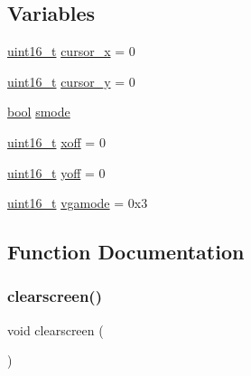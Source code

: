 \subsection*{Variables}
\begin{DoxyCompactItemize}
\item 
\hyperlink{a00134_a273cf69d639a59973b6019625df33e30_a273cf69d639a59973b6019625df33e30}{uint16\+\_\+t} \hyperlink{a00173_ae69604af0f9bd5fca2a016d0aa1ba7e1_ae69604af0f9bd5fca2a016d0aa1ba7e1}{cursor\+\_\+x} = 0
\item 
\hyperlink{a00134_a273cf69d639a59973b6019625df33e30_a273cf69d639a59973b6019625df33e30}{uint16\+\_\+t} \hyperlink{a00173_a0301c5492919c401c2c1ecf52af709b0_a0301c5492919c401c2c1ecf52af709b0}{cursor\+\_\+y} = 0
\item 
\hyperlink{a00134_af6a258d8f3ee5206d682d799316314b1_af6a258d8f3ee5206d682d799316314b1}{bool} \hyperlink{a00173_a22b8d30f7aee33f172c1239aed53e7db_a22b8d30f7aee33f172c1239aed53e7db}{smode}
\item 
\hyperlink{a00134_a273cf69d639a59973b6019625df33e30_a273cf69d639a59973b6019625df33e30}{uint16\+\_\+t} \hyperlink{a00173_abaa0d20f0e52ce0d3a7d706f6ac16266_abaa0d20f0e52ce0d3a7d706f6ac16266}{xoff} = 0
\item 
\hyperlink{a00134_a273cf69d639a59973b6019625df33e30_a273cf69d639a59973b6019625df33e30}{uint16\+\_\+t} \hyperlink{a00173_a1a7539764d0ae8cd06ce45c62cf92bca_a1a7539764d0ae8cd06ce45c62cf92bca}{yoff} = 0
\item 
\hyperlink{a00134_a273cf69d639a59973b6019625df33e30_a273cf69d639a59973b6019625df33e30}{uint16\+\_\+t} \hyperlink{a00173_af93b0649fdd1bea5b6d29ed37205aa2c_af93b0649fdd1bea5b6d29ed37205aa2c}{vgamode} = 0x3
\end{DoxyCompactItemize}


\subsection{Function Documentation}
\mbox{\label{a00173_aff4bc17c602603d120756f52e18ebb96_aff4bc17c602603d120756f52e18ebb96}} 
\subsubsection{\texorpdfstring{clearscreen()}{clearscreen()}}
{\footnotesize\ttfamily void clearscreen (\begin{DoxyParamCaption}{ }\end{DoxyParamCaption})}



